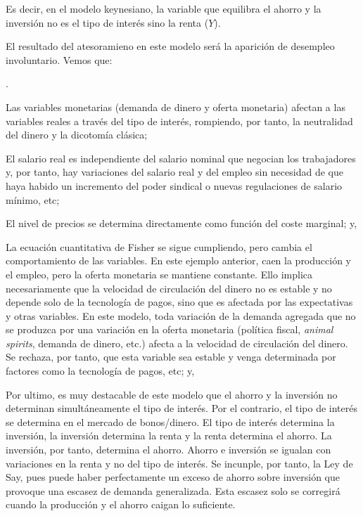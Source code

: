 \documentclass[10pt,a4paper]{article}
\newcounter{numitem}
\newenvironment{lnum}
      {\begin{list}{\arabic{numitem}.}{%
          \usecounter{numitem}%
          \setlength{\leftmargin}{1cm}%
          \setlength{\parskip}{3pt}%
          \setlength{\itemsep}{0pt}%
          \setlength{\parsep}{0pt}%
      }}
      {\end{list}}
\begin{document}
Es decir, en el modelo keynesiano, la variable que equilibra el ahorro y la inversión no es el tipo de interés sino la renta ($Y$).

El resultado del atesoramieno en este modelo será la aparición de desempleo involuntario. Vemos que:
\begin{lnum}
    \item Las variables monetarias (demanda de dinero y oferta monetaria) afectan a las variables reales a través del tipo de interés, rompiendo, por tanto, la neutralidad del dinero y la dicotomía clásica;
    \item El salario real es independiente del salario nominal que negocian los trabajadores y, por tanto, hay variaciones del salario real y del empleo sin necesidad de que haya habido un incremento del poder sindical o nuevas regulaciones de salario mínimo, etc;
    \item El nivel de precios se determina directamente como función del coste marginal; y,
    \item La ecuación cuantitativa de Fisher se sigue cumpliendo, pero cambia el comportamiento de las variables. En este ejemplo anterior, caen la producción y el empleo, pero la oferta monetaria se mantiene constante. Ello implica necesariamente que la velocidad de circulación del dinero no es estable y no depende solo de la tecnología de pagos, sino que es afectada por las expectativas y otras variables. En este modelo, toda variación de la demanda agregada que no se produzca por una variación en la oferta monetaria (política fiscal, \textit{animal spirits}, demanda de dinero, etc.) afecta a la velocidad de circulación del dinero. Se rechaza, por tanto, que esta variable sea estable y venga determinada por factores como la tecnología de pagos, etc; y,
    \item Por ultimo, es muy destacable de este modelo que el ahorro y la inversión no determinan simultáneamente el tipo de interés. Por el contrario, el tipo de interés se determina en el mercado de bonos/dinero. El tipo de interés determina la inversión, la inversión determina la renta y la renta determina el ahorro. La inversión, por tanto, determina el ahorro. Ahorro e inversión se igualan con variaciones en la renta y no del tipo de interés. Se incunple, por tanto, la Ley de Say, pues puede haber perfectamente un exceso de ahorro sobre inversión que provoque una escasez de demanda generalizada. Esta escasez solo se corregirá cuando la producción y el ahorro caigan lo suficiente.
\end{lnum}
\end{document}
